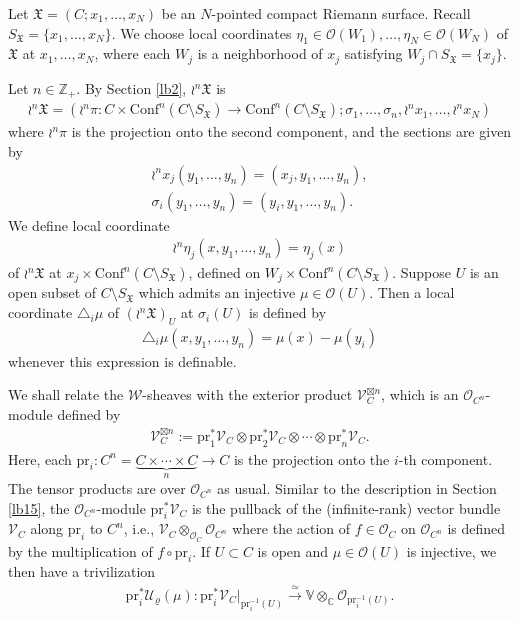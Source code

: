 \documentclass[12pt,a4paper,notitlepage]{article}
\theoremstyle{definition}
\theoremstyle{plain}
\newcommand{\fk}{\mathfrak}
\newcommand{\mc}{\mathcal}
\newcommand{\Conf}{\mathrm{Conf}}
\newcommand{\scr}{\mathscr}
\newcommand{\SX}{{S_{\fk X}}}
\newcommand{\Vbb}{\mathbb V}
\newcommand{\Cbb}{\mathbb C}
\newcommand{\Zbb}{\mathbb Z}
\newcommand{\pr}{\mathrm {pr}}
\numberwithin{equation}{section}
\begin{document}
Let $\fk X=(C;x_1,\dots,x_N)$ be an $N$-pointed compact Riemann surface. Recall $\SX=\{x_1,\dots,x_N\}$. We choose local coordinates $\eta_1\in\scr O(W_1),\dots,\eta_N\in\scr O(W_N)$ of $\fk X$ at $x_1,\dots,x_N$, where each $W_j$ is a neighborhood of $x_j$ satisfying $W_j\cap\SX=\{x_j\}$.

Let $n\in\Zbb_+$. By Section \ref{lb2}, $\wr^n\fk X$ is 
\begin{align*}
\wr^n\fk X=(\wr^n\pi:C\times\Conf^n(C\setminus\SX)\rightarrow\Conf^n(C\setminus\SX);\sigma_1,\dots,\sigma_n,\wr^nx_1,\dots,\wr^nx_N) 
\end{align*}
where $\wr^n\pi$ is the projection onto the second component, and the sections are given by
\begin{gather*}
\wr^nx_j(y_1,\dots,y_n)=(x_j,y_1,\dots,y_n),	\\
\sigma_i(y_1,\dots,y_n)=(y_i,y_1,\dots,y_n).	
\end{gather*}
We define local coordinate 
\begin{align}
	\wr^n\eta_j(x,y_1,\dots,y_n)=\eta_j(x)
\end{align}
of $\wr^n\fk X$ at $x_j\times\Conf^n(C\setminus\SX)$, defined on $W_j\times\Conf^n(C\setminus\SX)$. Suppose $U$ is an open subset of $C\setminus\SX$ which admits an injective $\mu\in\scr O(U)$. Then a local coordinate $\triangle_i\mu$ of $(\wr^n\fk X)_U$ at $\sigma_i(U)$ is defined by 
\begin{align}
\triangle_i\mu(x,y_1,\dots,y_n)=\mu(x)-\mu(y_i)	
\end{align}
whenever this expression is definable.


We shall relate the $\scr W$-sheaves with the exterior product $\scr V_C^{\boxtimes n}$, which is an $\scr O_{C^n}$-module defined by
\begin{align}
\scr V_C^{\boxtimes n}:=	\pr_1^*\scr V_C\otimes\pr_2^*\scr V_C\otimes\cdots\otimes\pr_n^*\scr V_C.
\end{align}
Here, each $\pr_i:C^n=\underbrace{C\times\cdots\times C}_n\rightarrow C$ is the projection onto the $i$-th component. The tensor products are over $\scr O_{C^n}$ as usual. Similar to the description in Section \ref{lb15}, the $\scr O_{C^n}$-module $\pr_i^*\scr V_C$ is the pullback of the (infinite-rank) vector bundle $\scr V_C$ along $\pr_i$ to $C^n$, i.e., $\scr V_C\otimes_{\scr O_{C}}\scr O_{C^n}$ where the action of $f\in\scr O_C$ on $\scr O_{C^n}$ is defined by the multiplication of $f\circ\pr_i$. If $U\subset C$ is open and $\mu\in\scr O(U)$ is injective, we then have a trivilization
\begin{align*}
\pr_i^*\mc U_\varrho(\mu):\pr_i^*\scr V_C\big|_{\pr_i^{-1}(U)}\xrightarrow{\simeq}\Vbb\otimes_\Cbb\scr O_{\pr_i^{-1}(U)}.	
\end{align*}
\end{document}
